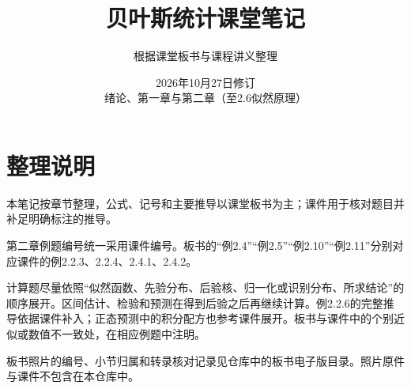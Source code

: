 \documentclass[UTF8,zihao=-4,oneside,openany]{ctexbook}
\title{贝叶斯统计课堂笔记}
\author{根据课堂板书与课程讲义整理}
\date{2026年10月27日修订\\绪论、第一章与第二章（至2.6似然原理）}
\begin{document}
\hypersetup{pageanchor=false}
\maketitle
\clearpage
{}
\hypersetup{pageanchor=true}
\tableofcontents
\chapter*{整理说明}
本笔记按章节整理，公式、记号和主要推导以课堂板书为主；课件用于核对题目并补足明确标注的推导。

第二章例题编号统一采用课件编号。板书的“例2.4”“例2.5”“例2.10”“例2.11”分别对应课件的例2.2.3、2.2.4、2.4.1、2.4.2。

计算题尽量依照“似然函数、先验分布、后验核、归一化或识别分布、所求结论”的顺序展开。区间估计、检验和预测在得到后验之后再继续计算。例2.2.6的完整推导依据课件补入；正态预测中的积分配方也参考课件展开。板书与课件中的个别近似或数值不一致处，在相应例题中注明。

板书照片的编号、小节归属和转录核对记录见仓库中的板书电子版目录。照片原件与课件不包含在本仓库中。

\clearpage
{}


\end{document}
